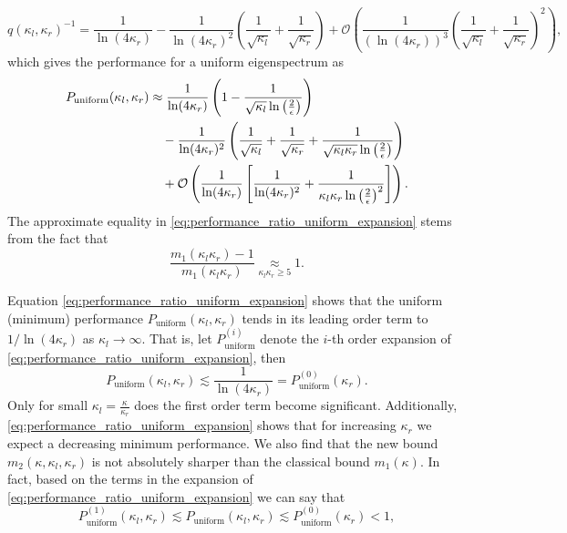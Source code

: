 \[
    q(\kappa_l, \kappa_r)^{-1} = \frac{1}{\ln(4\kappa_r)} - \frac{1}{\ln(4\kappa_r)^2}\left(\frac{1}{\sqrt{\kappa_l}} + \frac{1}{\sqrt{\kappa_r}}\right) + \mathcal{O}\left(\frac{1}{(\ln(4\kappa_r))^3}\left(\frac{1}{\sqrt{\kappa_l}} + \frac{1}{\sqrt{\kappa_r}}\right)^2\right),
\]
which gives the performance for a uniform eigenspectrum as
\begin{align}
    P_{\text{uniform}}(\kappa_l, \kappa_r) & \approx \frac{1}{\ln(4\kappa_r)} \left(1 - \frac{1}{\sqrt{\kappa_l}\ln\left(\frac{2}{\epsilon}\right)}\right) \notag                                                              \\
                                           & \quad - \frac{1}{\ln(4\kappa_r)^2}\left(\frac{1}{\sqrt{\kappa_l}} + \frac{1}{\sqrt{\kappa_r}} + \frac{1}{\sqrt{\kappa_l\kappa_r}\ln\left(\frac{2}{\epsilon}\right)}\right) \notag \\
                                           & \quad + \mathcal{O}\left(\frac{1}{\ln(4\kappa_r)}\left[\frac{1}{\ln(4\kappa_r)^2} + \frac{1}{\kappa_l\kappa_r\ln\left(\frac{2}{\epsilon}\right)^2}\right]\right).
    \label{eq:performance_ratio_uniform_expansion}
\end{align}
The approximate equality in \cref{eq:performance_ratio_uniform_expansion} stems from the fact that
\[
    \frac{m_1(\kappa_l\kappa_r)-1}{m_1(\kappa_l\kappa_r)} \underset{\kappa_l\kappa_r \geq 5}{\approx} 1.
\]

Equation \ref{eq:performance_ratio_uniform_expansion} shows that the uniform (minimum) performance $P_{\text{uniform}}(\kappa_l, \kappa_r)$ tends in its leading order term to $1/\ln(4\kappa_r)$ as $\kappa_l \to \infty$. That is, let $P^{(i)}_{\text{uniform}}$ denote the $i$-th order expansion of \cref{eq:performance_ratio_uniform_expansion}, then
\[
    P_{\text{uniform}}(\kappa_l, \kappa_r) \lesssim \frac{1}{\ln(4\kappa_r)} = P^{(0)}_{\text{uniform}}(\kappa_r).
\]
Only for small $\kappa_l = \frac{\kappa}{\kappa_r}$ does the first order term become significant. Additionally, \cref{eq:performance_ratio_uniform_expansion} shows that for increasing $\kappa_r$ we expect a decreasing minimum performance. We also find that the new bound $m_2(\kappa,\kappa_l,\kappa_r)$ is not absolutely sharper than the classical bound $m_1(\kappa)$. In fact, based on the terms in the expansion of \cref{eq:performance_ratio_uniform_expansion} we can say that
\begin{equation}
    P^{(1)}_{\text{uniform}}(\kappa_l, \kappa_r) \lesssim P_{\text{uniform}}(\kappa_l, \kappa_r) \lesssim P^{(0)}_{\text{uniform}}(\kappa_r) < 1,
    \label{eq:performance_ratio_no_improvement_bounds}
\end{equation}

